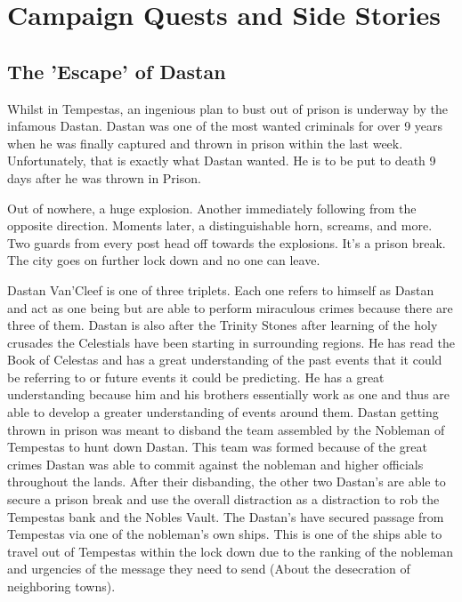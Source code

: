 \chapter{Campaign Quests and Side Stories} \label{Quests}

\section{The 'Escape' of Dastan}

Whilst in Tempestas, an ingenious plan to bust out of prison is underway by the infamous Dastan. Dastan was one of the most wanted criminals for over 9 years when he was finally captured and thrown in prison within the last week. Unfortunately, that is exactly what Dastan wanted. He is to be put to death 9 days after he was thrown in Prison.

Out of nowhere, a huge explosion. Another immediately following from the opposite direction. Moments later, a distinguishable horn, screams, and more. Two guards from every post head off towards the explosions. It’s a prison break. The city goes on further lock down and no one can leave. 

Dastan Van’Cleef is one of three triplets. Each one refers to himself as Dastan and act as one being but are able to perform miraculous crimes because there are three of them. Dastan is also after the Trinity Stones after learning of the holy crusades the Celestials have been starting in surrounding regions. He has read the Book of Celestas and has a great understanding of the past events that it could be referring to or future events it could be predicting. He has a great understanding because him and his brothers essentially work as one and thus are able to develop a greater understanding of events around them. Dastan getting thrown in prison was meant to disband the team assembled by the Nobleman of Tempestas to hunt down Dastan. This team was formed because of the great crimes Dastan was able to commit against the nobleman and higher officials throughout the lands. After their disbanding, the other two Dastan’s are able to secure a prison break and use the overall distraction as a distraction to rob the Tempestas bank and the Nobles Vault. The Dastan’s have secured passage from Tempestas via one of the nobleman’s own ships. This is one of the ships able to travel out of Tempestas within the lock down due to the ranking of the nobleman and urgencies of the message they need to send (About the desecration of neighboring towns).

